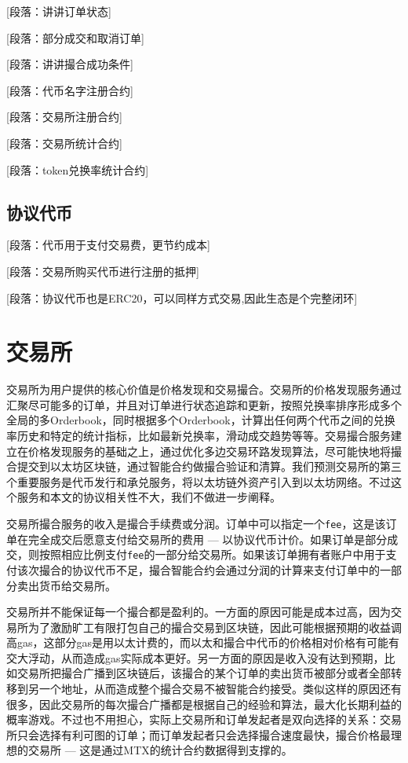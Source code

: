\documentclass[UTF8,nofonts]{ctexart}
\begin{document}
[段落：讲讲订单状态]

[段落：部分成交和取消订单]

[段落：讲讲撮合成功条件]


[段落：代币名字注册合约]

[段落：交易所注册合约]

[段落：交易所统计合约]

[段落：token兑换率统计合约]

\subsection{协议代币\label{sec:token}}



[段落：代币用于支付交易费，更节约成本]

[段落：交易所购买代币进行注册的抵押]

[段落：协议代币也是ERC20，可以同样方式交易,因此生态是个完整闭环]


\section{交易所\label{sec:exchange}}

交易所为用户提供的核心价值是价格发现和交易撮合。交易所的价格发现服务通过汇聚尽可能多的订单，并且对订单进行状态追踪和更新，按照兑换率排序形成多个全局的多Orderbook，同时根据多个Orderbook，计算出任何两个代币之间的兑换率历史和特定的统计指标，比如最新兑换率，滑动成交趋势等等。交易撮合服务建立在价格发现服务的基础之上，通过优化多边交易环路发现算法，尽可能快地将撮合提交到以太坊区块链，通过智能合约做撮合验证和清算。我们预测交易所的第三个重要服务是代币发行和承兑服务，将以太坊链外资产引入到以太坊网络。不过这个服务和本文的协议相关性不大，我们不做进一步阐释。

交易所撮合服务的收入是撮合手续费或分润。订单中可以指定一个\verb|fee|，这是该订单在完全成交后愿意支付给交易所的费用 --- 以协议代币计价。如果订单是部分成交，则按照相应比例支付\verb|fee|的一部分给交易所。如果该订单拥有者账户中用于支付该次撮合的协议代币不足，撮合智能合约会通过分润的计算来支付订单中的一部分卖出货币给交易所。

交易所并不能保证每一个撮合都是盈利的。一方面的原因可能是成本过高，因为交易所为了激励旷工有限打包自己的撮合交易到区块链，因此可能根据预期的收益调高gas，这部分gas是用以太计费的，而以太和撮合中代币的价格相对价格有可能有交大浮动，从而造成gas实际成本更好。另一方面的原因是收入没有达到预期，比如交易所把撮合广播到区块链后，该撮合的某个订单的卖出货币被部分或者全部转移到另一个地址，从而造成整个撮合交易不被智能合约接受。类似这样的原因还有很多，因此交易所的每次撮合广播都是根据自己的经验和算法，最大化长期利益的概率游戏。不过也不用担心，实际上交易所和订单发起者是双向选择的关系：交易所只会选择有利可图的订单；而订单发起者只会选择撮合速度最快，撮合价格最理想的交易所 --- 这是通过MTX的统计合约数据得到支撑的。
\end{document}
